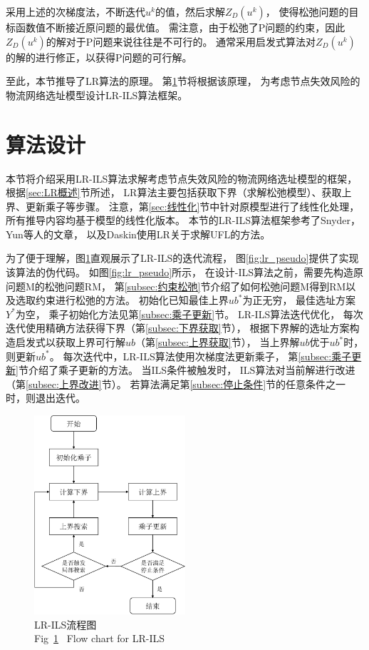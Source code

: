 采用上述的次梯度法，不断迭代$u^k$的值，然后求解$Z_D(u^k)$，
使得松弛问题的目标函数值不断接近原问题的最优值。
需注意，由于松弛了P问题的约束，因此$Z_D(u^k)$的解对于P问题来说往往是不可行的。
通常采用启发式算法对$Z_D(u^k)$的解的进行修正，以获得P问题的可行解。

至此，本节推导了LR算法的原理。
第\ref{sec:LR框架}节将根据该原理，
为考虑节点失效风险的物流网络选址模型设计LR-ILS算法框架。

\section{算法设计}
\label{sec:LR框架}
本节将介绍采用LR-ILS算法求解考虑节点失效风险的物流网络选址模型的框架，
根据\ref{sec:LR概述}节所述，
LR算法主要包括获取下界（求解松弛模型）、获取上界、更新乘子等步骤。
注意，第\ref{sec:线性化}节中针对原模型进行了线性化处理，
所有推导内容均基于模型的线性化版本。
本节的LR-ILS算法框架参考了Snyder\cite{Snyder2005}，
Yun等人\cite{yun2015, YUN2020}的文章，
以及Daskin\cite{Daskin书}使用LR关于求解UFL的方法。

为了便于理解，图\ref{fig:lr_frame}直观展示了LR-ILS的迭代流程，
图\ref{fig:lr_pseudo}提供了实现该算法的伪代码。
如图\ref{fig:lr_pseudo}所示，
在设计-ILS算法之前，需要先构造原问题M的松弛问题RM，
第\ref{subsec:约束松弛}节介绍了如何松弛问题M得到RM以及选取约束进行松弛的方法。
初始化已知最佳上界$ub^*$为正无穷，
最佳选址方案$Y^*$为空，
乘子初始化方法见第\ref{subsec:乘子更新}节。
LR-ILS算法迭代优化，
每次迭代使用精确方法获得下界（第\ref{subsec:下界获取}节），
根据下界解的选址方案构造启发式以获取上界可行解$ub$（第\ref{subsec:上界获取}节），
当上界解$ub$优于$ub^*$时，
则更新$ub^*$。
每次迭代中，LR-ILS算法使用次梯度法更新乘子，
第\ref{subsec:乘子更新}节介绍了乘子更新的方法。
当ILS条件被触发时，
ILS算法对当前解进行改进（第\ref{subsec:上界改进}节）。
若算法满足第\ref{subsec:停止条件}节的任意条件之一时，则退出迭代。
\begin{figure}[!ht] %
\setlength{\belowcaptionskip}{-0.5cm} 
  \centering
  \includegraphics[width=0.5\textwidth]{figures/lr_frame.pdf}
  \caption{LR-ILS流程图\\Fig~\ref{fig:lr_frame}~ Flow chart for LR-ILS}
  \label{fig:lr_frame}
  \vspace{2ex}
\end{figure}

